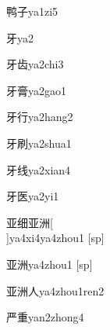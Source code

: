 \begin{verbete}[10;3]{鸭子}{ya1zi5}
\end{verbete}

\begin{verbete}[4]{牙}{ya2}
\end{verbete}

\begin{verbete}[4;8]{牙齿}{ya2chi3}
\end{verbete}

\begin{verbete}[4;14]{牙膏}{ya2gao1}
\end{verbete}

\begin{verbete}[4;6]{牙行}{ya2hang2}
\end{verbete}

\begin{verbete}[4;8]{牙刷}{ya2shua1}
\end{verbete}

\begin{verbete}[4;8]{牙线}{ya2xian4}
\end{verbete}

\begin{verbete}[4;7]{牙医}{ya2yi1}
\end{verbete}

\begin{verbete*}[6;8;6;9]{亚细亚洲}[\\]{ya4xi4ya4zhou1}
  [sp]
\end{verbete*}

\begin{verbete*}[6;9]{亚洲}{ya4zhou1}
  [sp]
\end{verbete*}

\begin{verbete}[6;9;2]{亚洲人}{ya4zhou1ren2}
\end{verbete}

\begin{verbete}[7;9]{严重}{yan2zhong4}
\end{verbete}


